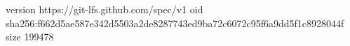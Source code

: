 version https://git-lfs.github.com/spec/v1
oid sha256:f662d5ae587e342d5503a2de8287743ed9ba72c6072c95f6a9dd5f1c8928044f
size 199478
